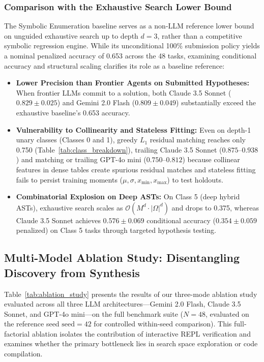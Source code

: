 \documentclass[sigconf]{acmart}
\begin{document}
\subsubsection{Comparison with the Exhaustive Search Lower Bound}
The Symbolic Enumeration baseline serves as a non-LLM reference lower bound on unguided exhaustive search up to depth $d=3$, rather than a competitive symbolic regression engine. While its unconditional 100\% submission policy yields a nominal penalized accuracy of 0.653 across the 48 tasks, examining conditional accuracy and structural scaling clarifies its role as a baseline reference:
\begin{itemize}
    \item \textbf{Lower Precision than Frontier Agents on Submitted Hypotheses:} When frontier LLMs commit to a solution, both Claude 3.5 Sonnet (\textbf{$0.829 \pm 0.025$}) and Gemini 2.0 Flash (\textbf{$0.809 \pm 0.049$}) substantially exceed the exhaustive baseline's 0.653 accuracy.
    \item \textbf{Vulnerability to Collinearity and Stateless Fitting:} Even on depth-1 unary classes (Classes 0 and 1), greedy $L_1$ residual matching reaches only 0.750 (Table~\ref{tab:class_breakdown}), trailing Claude 3.5 Sonnet ($0.875$--$0.938$) and matching or trailing GPT-4o mini ($0.750$--$0.812$) because collinear features in dense tables create spurious residual matches and stateless fitting fails to persist training moments ($\mu, \sigma, x_{\min}, x_{\max}$) to test holdouts.
    \item \textbf{Combinatorial Explosion on Deep ASTs:} On Class 5 (deep hybrid ASTs), exhaustive search scales as $\mathcal{O}(M^d \cdot |\Omega|^d)$ and drops to 0.375, whereas Claude 3.5 Sonnet achieves $0.576 \pm 0.069$ conditional accuracy ($0.354 \pm 0.059$ penalized) on Class 5 tasks through targeted hypothesis testing.
\end{itemize}




\subsection{Multi-Model Ablation Study: Disentangling Discovery from Synthesis}
Table~\ref{tab:ablation_study} presents the results of our three-mode ablation study evaluated across all three LLM architectures—Gemini 2.0 Flash, Claude 3.5 Sonnet, and GPT-4o mini—on the full benchmark suite ($N=48$, evaluated on the reference seed $\text{seed}=42$ for controlled within-seed comparison). This full-factorial ablation isolates the contribution of interactive REPL verification and examines whether the primary bottleneck lies in search space exploration or code compilation.
\end{document}
